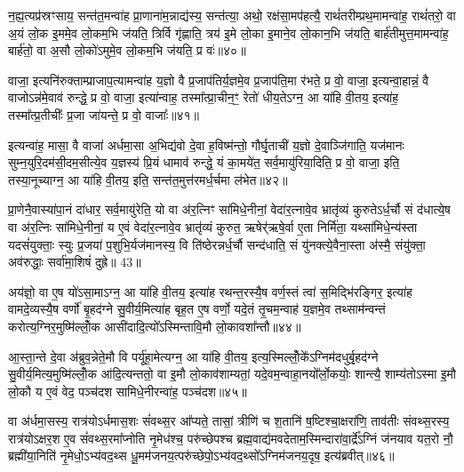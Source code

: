 न॒ह्य॒त्यप्र॑स्रꣳसाय॒ सन्त॑त॒मन्वा॑ह प्रा॒णाना॑म॒न्नाद्य॑स्य॒ सन्त॑त्या॒ अथो॒ रक्ष॑सा॒मप॑हत्यै॒ राथं॑तरीम्प्रथ॒मामन्वा॑ह॒ राथं॑तरो॒ वा अ॒यं लो॒क इ॒ममे॒व लो॒कम॒भि ज॑यति॒ त्रिर्वि गृ॑ह्णाति॒ त्रय॑ इ॒मे लो॒का इ॒माने॒व लो॒कान॒भि ज॑यति॒ बार्\mbox{}ह॑तीमुत्त॒मामन्वा॑ह॒ बार्\mbox{}ह॑तो॒ वा अ॒सौ लो॒को॑\-ऽमुमे॒व लो॒कम॒भि ज॑यति॒ प्र वः॑॥४०॥

वाजा॒ इत्यनि॑रुक्ताम्प्राजाप॒त्यामन्वा॑ह य॒ज्ञो वै प्र॒जाप॑तिर्य॒ज्ञमे॒व प्र॒जाप॑ति॒मा र॑भते॒ प्र वो॒ वाजा॒ इत्यन्वा॒हान्नं॒ वै वाजो\-ऽन्न॑मे॒वाव॑ रुन्द्धे॒ प्र वो॒ वाजा॒ इत्या॑न्वाह॒ तस्मा᳚त्प्रा॒चीन॒ꣳ॒ रेतो॑ धीय॒ते\-ऽग्न॒ आ या॑हि वी॒तय॒ इत्या॑ह॒ तस्मा᳚त्प्र॒तीचीः᳚ प्र॒जा जा॑यन्ते॒ प्र वो॒ वाजाः᳚॥४१॥

इत्यन्वा॑ह॒ मासा॒ वै वाजा॑ अर्धमा॒सा अ॒भिद्य॑वो दे॒वा ह॒विष्म॑न्तो॒ गौर्घृ॒ताची॑ य॒ज्ञो दे॒वाञ्जि॑गाति॒ यज॑मानः सुम्न॒युरि॒दम॑सी॒दम॒सीत्ये॒व य॒ज्ञस्य॑ प्रि॒यं धामाव॑ रुन्द्धे॒ यं का॒मये॑त॒ सर्व॒मायु॑रिया॒दिति॒ प्र वो॒ वाजा॒ इति॒ तस्या॒नूच्याग्न॒ आ या॑हि वी॒तय॒ इति॒ सन्त॑त॒मुत्त॑रमर्ध॒र्चमा ल॑भेत॥४२॥

प्रा॒णेनै॒वास्या॑पा॒नं दा॑धार॒ सर्व॒मायु॑रेति॒ यो वा अ॑र॒त्निꣳ सा॑मिधे॒नीनां॒ वेदा॑र॒त्नावे॒व भ्रातृ॑व्यं कुरुते\-ऽर्ध॒र्चौ सं द॑धात्ये॒ष वा अ॑र॒त्निः सा॑मिधे॒नीनां॒ य ए॒वं वेदा॑र॒त्नावे॒व भ्रातृ॑व्यं कुरुत॒ ऋषेर्\mbox{}॑ऋषे॒र्वा ए॒ता निर्मि॑ता॒ यथ्सा॑मिधे॒न्य॑स्ता यदसं॑युक्ताः॒ स्युः प्र॒जया॑ प॒शुभि॒र्यज॑मानस्य॒ वि ति॑ष्ठेरन्नर्ध॒र्चौ सन्द॑धाति॒ सं यु॑नक्त्ये॒वैना॒स्ता अ॑स्मै॒ संयु॑क्ता॒ अव॑रुद्धाः॒ सर्वा॑मा॒शिषं॑ दुह्रे॥ 43॥


{\anuvakamend[{ब॒र्\mbox{}सं वो॑ जायन्ते॒ प्र वो॒ वाजा॑ लभेत दधाति॒ सन्दश॑ च॥७॥}]}

अय॑ज्ञो॒ वा ए॒ष यो॑\-ऽसा॒मा\-ऽग्न॒ आ या॑हि वी॒तय॒ इत्या॑ह रथन्त॒रस्यै॒ष वर्ण॒स्तं त्वा॑ स॒मिद्भि॑रङ्गिर॒ इत्या॑ह वामदे॒व्यस्यै॒ष वर्णो॑ बृ॒हद॑ग्ने सु॒वीर्य॒मित्या॑ह बृह॒त ए॒ष वर्णो॒ यदे॒तं तृ॒चम॒न्वाह॑ य॒ज्ञमे॒व तथ्साम॑न्वन्तं करोत्य॒ग्निर॒मुष्मि॑ल्लोँ॒क आसी॑दादि॒त्यो᳚\-ऽस्मिन्तावि॒मौ लो॒कावशा᳚न्तौ॥४४॥

आ॒स्ता॒न्ते दे॒वा अ॑ब्रुव॒न्नेते॒मौ वि पर्यू॑हा॒मेत्यग्न॒ आ या॑हि वी॒तय॒ इत्य॒स्मिल्लोँ॒के᳚\-ऽग्निम॑दधुर्बृ॒हद॑ग्ने सु॒वीर्य॒मित्य॒मुष्मि॑ल्लोँ॒क आ॑दि॒त्यन्ततो॒ वा इ॒मौ लो॒काव॑शाम्यतां॒ यदे॒वम॒न्वाहा॒नयो᳚र्लो॒कयोः॒ शान्त्यै॒ शाम्य॑तो\-ऽस्मा इ॒मौ लो॒कौ य ए॒वं वेद॒ पञ्च॑दश सामिधे॒नीरन्वा॑ह॒ पञ्च॑दश॥४५॥

वा अ॑र्धमा॒सस्य॒ रात्र॑यो\-ऽर्धमास॒शः सं॑वथ्स॒र आ᳚प्यते॒ तासां॒ त्रीणि॑ च श॒तानि॑ ष॒ष्टिश्चा॒क्षरा॑णि॒ ताव॑तीः संवथ्स॒रस्य॒ रात्र॑यो\-ऽक्षर॒श ए॒व सं॑वथ्स॒रमा᳚प्नोति नृ॒मेध॑श्च॒ परु॑च्छेपश्च ब्रह्म॒वाद्य॑मवदेताम॒स्मिन्दारा॑वा॒र्द्रे᳚\-ऽग्निं ज॑नयाव यत॒रो नौ॒ ब्रह्मी॑या॒निति॑ नृ॒मेधो॒\-ऽभ्य॑वद॒थ्स धू॒मम॑जनय॒त्परु॑च्छेपो॒\-ऽभ्य॑वद॒थ्सो᳚\-ऽग्निम॑जनय॒दृष॒ इत्य॑ब्रवीत्॥४६॥


